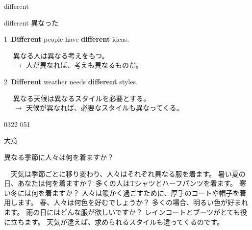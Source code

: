 \documentclass[aspectratio=169,xcolor={dvipsnames,table}]{beamer}
\begin{document}
\begin{frame}[plain,t]{different}
 \Large

different  {\normalsize {} 異なった}\pause

\bigskip

1\,\,\,\textbf{Different} people have \textbf{different} ideas.\pause

\normalsize

\,\,\,\,\,\,\,\,異なる人は異なる考えをもつ。\\\pause
\,\,\,\,\,\,\,\,$\longrightarrow$
人が異なれば、考えも異なるものだ。\pause

\bigskip


\Large
2\,\,\,\textbf{Different} weather needs \textbf{different} styles.\pause

\normalsize
\,\,\,\,\,\,\,\,異なる天候は異なるスタイルを必要とする。\\\pause
\,\,\,\,\,\,\,\,$\longrightarrow$
天候が異なれば、必要なスタイルも異なってくる。

\hfill{\tiny 0322}\,{\tiny{}\,051}
\end{frame}
\begin{frame}[plain]{大意}

異なる季節に人々は何を着ますか？

\bigskip

　天気は季節ごとに移り変わり、人々はそれぞれ異なる服を着ます。
暑い夏の日、あなたは何を着ますか？
多くの人はTシャツとハーフパンツを着ます。
寒い冬には何を着ますか？ 
人々は暖かく過ごすために、厚手のコートや帽子を着用します。
春、人々は何色を好むでしょうか？ 
多くの場合、明るい色が好まれます。
雨の日にはどんな服が欲しいですか？ 
レインコートとブーツがとても役に立ちます。
天気が違えば、求められるスタイルも違ってくるのです。
\end{frame}
\end{document}
